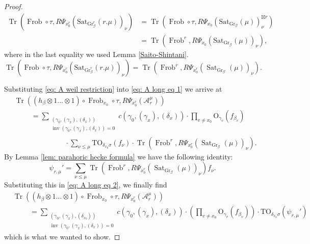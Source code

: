 \documentclass[reqno]{amsart}
\numberwithin{equation}{section}
\newcommand{\Cal}[1]{\mathcal{#1}}
\newcommand{\mrm}[1]{\mathrm{#1}}
\DeclareMathOperator{\Frob}{Frob}
\DeclareMathOperator{\Tr}{Tr}
\DeclareMathOperator{\Gr}{Gr}
\DeclareMathOperator{\inv}{inv}
\DeclareMathOperator{\Sat}{Sat}
\theoremstyle{remark}
\numberwithin{equation}{section}
\begin{document}
\begin{proof}
{\begin{align*}
\Tr( \Frob  \circ  \tau , R\Psi_{x_0^r} (\mrm{Sat}_{\Gr_{\Cal{G}}^r}(r.\mu))_{\nu}) & = \Tr(\Frob \circ \tau, R\Psi_{x_0}(\mrm{Sat}_{\Gr_{\Cal{G}}}(\mu))^{\boxtimes r}_{\nu}) \\
&= \Tr(\Frob^r  ,R\Psi_{x_0}(\mrm{Sat}_{\Gr_{\Cal{G}}}(\mu))_{\nu}),
\end{align*}
where in the last equality we used Lemma \ref{Saito-Shintani}.}
\begin{equation}\label{eq: A weil restriction}
\Tr(\Frob \circ  \tau , R\Psi_{x_0^r} (\mrm{Sat}_{\Gr_{\Cal{G}}^r}(r.\mu))_{\nu}) = \Tr(\Frob^r, R\Psi_{x_0^r} (\Sat_{ \Gr_{\Cal{G}} }(\mu))_{\nu}).
\end{equation}

Substituting \eqref{eq: A weil restriction} into \eqref{eq: A long eq 1} we arrive at
\begin{align}\label{eq: A long eq 2}
&\Tr(( h_{\beta} \otimes 1 \ldots \otimes 1 ) \circ \Frob_{x_0} \circ  \tau , R\Psi_{x_0^r}(\Cal{A}_r^{\mu}))  \nonumber \\ 
& \hspace{1cm} =  \sum_{\substack{ (\gamma_0, (\gamma_x),(\delta_x)) \\ \inv(\gamma_0, (\gamma_x),(\delta_x) ) = 0  }} 
c(\gamma_0, (\gamma_x), (\delta_x))   \cdot \prod_{v \neq x_0} \mrm{O}_{\gamma_v}(f_{\beta_v})  \nonumber \\
&\hspace{3cm} \cdot 	\sum_{\nu \leq \mu}  \mrm{TO}_{\delta_{x_0} \sigma}(f_{\nu})  \cdot \Tr(\Frob^r, R\Psi_{x_0^r} (\Sat_{ \Gr_{\Cal{G}} }(\mu))_{\nu}).
\end{align}
By Lemma \ref{lem: parahoric hecke formula} we have the following identity:
\[
\psi_{r,\mu}' = \sum_{\nu \leq \mu} \Tr(\Frob^r, R\Psi_{x_0^r}(\Sat_{ \Gr_{\Cal{G}} }(\mu))_{\nu})  f_{\nu} .
\]
Substituting this in \eqref{eq: A long eq 2}, we finally find
\begin{align*}
&\Tr(( h_{\beta} \otimes 1 \ldots \otimes 1 ) \circ \Frob_{x_0} \circ  \tau , R\Psi_{x_0^r}(\Cal{A}_r^{\mu}))  \\
& \hspace{1cm} =   \sum_{\substack{ (\gamma_0, (\gamma_x),(\delta_{x_0})) \\ \inv(\gamma_0, (\gamma_x),(\delta_x) ) = 0  }} 
c(\gamma_0, (\gamma_x), (\delta_x))   \cdot  \left( \prod_{v \neq x_0}\mrm{O}_{\gamma_v}(f_{\beta_v})  \right) \cdot  \mrm{TO}_{\delta_{x_0} \sigma}(\psi_{r,\mu}')
\end{align*}
which is what we wanted to show. 
\end{proof}
\end{document}

